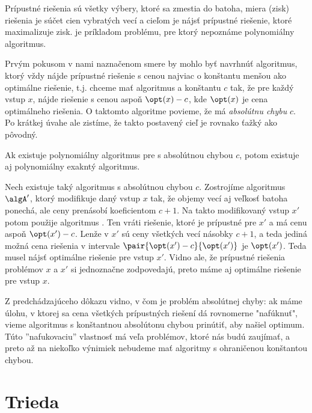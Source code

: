 Prípustné riešenia sú všetky výbery, ktoré sa zmestia do batoha, miera (zisk)
riešenia je súčet cien vybratých vecí a cieľom je nájsť prípustné riešenie,
ktoré maximalizuje zisk. \knapsack je príkladom problému, pre ktorý nepoznáme
polynomiálny algoritmus. 

Prvým pokusom v nami naznačenom smere  by mohlo byť navrhnúť algoritmus, ktorý
vždy nájde prípustné riešenie s cenou najviac o konštantu menšou ako optimálne
riešenie, t.j. chceme mať algoritmus \algA a konštantu $c$ tak,
že pre každý vstup $x$, \algA nájde riešenie s cenou aspoň $\opt(x)-c$, kde
$\opt(x)$ je cena optimálneho riešenia. O taktomto algoritme povieme, že má
{\em absolútnu chybu} $c$.
Po krátkej úvahe ale zistíme, že takto postavený cieľ je rovnako ťažký ako pôvodný.

\begin{veta}
  Ak existuje polynomiálny algoritmus pre \knapsack s absolútnou chybou $c$,
potom existuje aj polynomiálny exakntý algoritmus.  
\end{veta}

\begin{dokaz}
  Nech existuje taký algoritmus \algA s absolútnou chybou $c$. Zostrojíme
  algoritmus $\algA'$, ktorý modifikuje daný vstup $x$ tak, že objemy vecí aj
  veľkosť batoha ponechá, ale ceny prenásobí koeficientom $c+1$. Na takto
  modifikovaný vstup $x'$ potom použije algoritmus \algA.  Ten vráti riešenie,
  ktoré je prípustné pre $x'$ a má cenu aspoň $\opt(x')-c$. Lenže v $x'$ sú
  ceny všetkých vecí násobky $c+1$, a teda jediná možná cena riešenia v
  intervale $\pair{\opt(x')-c}{\opt(x')}$ je $\opt(x')$. Teda \algA musel nájsť
  optimálne riešenie pre vstup $x'$. Vidno ale, že prípustné riešenia problémov
  $x$ a $x'$ si jednoznačne zodpovedajú, preto máme aj optimálne riešenie pre
  vstup $x$.
\end{dokaz}

Z predchádzajúceho dôkazu vidno, v čom je problém absolútnej chyby: ak máme
úlohu, v ktorej sa cena všetkých prípustných riešení  dá rovnomerne "nafúknuť",
vieme algoritmus s konštantnou absolútonu chybou prinútiť, aby našiel optimum.
Túto ''nafukovaciu'' vlastnosť má veľa problémov, ktoré nás budú zaujímať, a
preto až na niekoľko výnimiek nebudeme mať algoritmy s ohraničenou konštantou
chybou. 

\section*{Trieda \APX}

